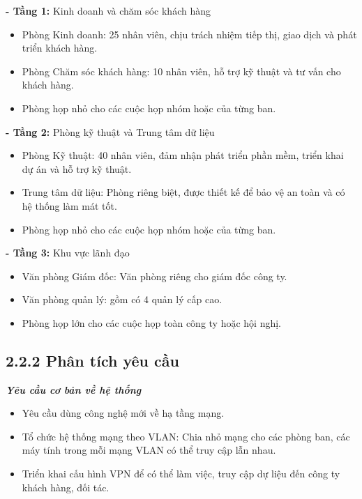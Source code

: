 \textbf{- Tầng 1:} Kinh doanh và chăm sóc khách hàng
   \begin{itemize}[left=2.5cm]
    \item Phòng Kinh doanh: 25 nhân viên, chịu trách nhiệm tiếp thị, giao dịch và phát triển khách hàng.
    \item Phòng Chăm sóc khách hàng: 10 nhân viên, hỗ trợ kỹ thuật và tư vấn cho khách hàng.
    \item Phòng họp nhỏ cho các cuộc họp nhóm hoặc của từng ban.
\end{itemize}

\textbf{- Tầng 2:} Phòng kỹ thuật và Trung tâm dữ liệu
   \begin{itemize}[left=2.5cm]
    \item Phòng Kỹ thuật: 40 nhân viên, đảm nhận phát triển phần mềm, triển khai dự án và hỗ trợ kỹ thuật.
    \item Trung tâm dữ liệu: Phòng riêng biệt, được thiết kế để bảo vệ an toàn và có hệ thống làm mát tốt.
    \item Phòng họp nhỏ cho các cuộc họp nhóm hoặc của từng ban.
\end{itemize}

\textbf{- Tầng 3:} Khu vực lãnh đạo
   \begin{itemize}[left=2.5cm]
    \item Văn phòng Giám đốc: Văn phòng riêng cho giám đốc công ty.
    \item Văn phòng quản lý: gồm có 4 quản lý cấp cao.
    \item Phòng họp lớn cho các cuộc họp toàn công ty hoặc hội nghị.
\end{itemize}
\subsection*{2.2.2 Phân tích yêu cầu }
\textbf{\textit{Yêu cầu cơ bản về hệ thống}}
\begin{itemize}[left=2.5cm]
    \item Yêu cầu dùng công nghệ mới về hạ tầng mạng.
    \item Tổ chức hệ thống mạng theo VLAN: Chia nhỏ mạng cho các phòng ban, các máy tính trong mỗi mạng VLAN có thể truy cập lẫn nhau.
    \item Triển khai cấu hình VPN để có thể làm việc, truy cập dự liệu đến công ty khách hàng, đối tác.
\end{itemize}

